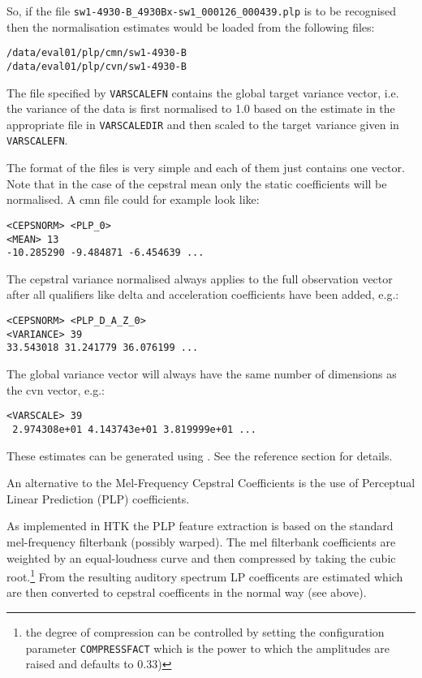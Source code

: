 So, if the file \verb|sw1-4930-B_4930Bx-sw1_000126_000439.plp| is to be
recognised then the normalisation estimates would be loaded from the
following files:

\begin{verbatim}
/data/eval01/plp/cmn/sw1-4930-B
/data/eval01/plp/cvn/sw1-4930-B
\end{verbatim}

The file specified by
\texttt{VARSCALEFN} contains the
global target variance vector, i.e. the variance of the data is first
normalised to 1.0 based on the estimate in the appropriate file in
\texttt{VARSCALEDIR} and then
scaled to the target variance given in
\texttt{VARSCALEFN}.

The format of the files is very simple and each of them just contains
one vector. Note that in the case of the cepstral mean only the static
coefficients will be normalised. A cmn file could for example look like:

\begin{verbatim}
<CEPSNORM> <PLP_0>
<MEAN> 13
-10.285290 -9.484871 -6.454639 ...
\end{verbatim}


The cepstral variance normalised always applies to the full
observation vector after all qualifiers like delta and acceleration
coefficients have been added, e.g.:

\begin{verbatim}
<CEPSNORM> <PLP_D_A_Z_0>
<VARIANCE> 39
33.543018 31.241779 36.076199 ...
\end{verbatim}

The global variance vector will always have the same number of
dimensions as the cvn vector, e.g.:

\begin{verbatim}
<VARSCALE> 39
 2.974308e+01 4.143743e+01 3.819999e+01 ...
\end{verbatim}

These estimates can be generated using . See the
reference section for details.

 

An alternative to the Mel-Frequency Cepstral Coefficients is the use
of Perceptual Linear Prediction (PLP) coefficients.

As implemented in HTK the PLP feature extraction is based on the
standard mel-frequency filterbank (possibly warped). The mel
filterbank coefficients are weighted by an equal-loudness curve and
then compressed by taking the cubic root.\footnote{the degree of
  compression can be controlled by setting the configuration parameter
  \texttt{COMPRESSFACT} which
  is the power to which the amplitudes are raised and defaults to
  0.33)} From the resulting auditory spectrum LP coefficents are
estimated which are then converted to cepstral coefficents in the
normal way (see above).


